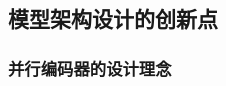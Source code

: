 \documentclass{article}
\begin{document}









\subsection{模型架构设计的创新点}

\subsubsection{并行编码器的设计理念}
\end{document}

